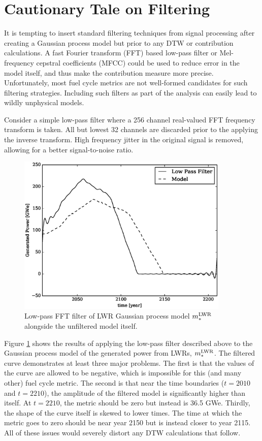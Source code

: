\clearpage
\section{Cautionary Tale on Filtering}
\label{filtering}

It is tempting to insert standard filtering techniques from signal processing 
after creating a Gaussian process model but prior to any DTW or contribution 
calculations. A fast Fourier transform (FFT) \citeme based low-pass filter or 
Mel-frequency cepstral coefficients (MFCC) \citeme could be used to reduce error 
in the model itself, 
and thus make the contribution measure more precise. Unfortunately, most 
fuel cycle metrics are not well-formed candidates for such filtering strategies.
Including such filters as part of the analysis can easily lead to wildly unphysical
models.

Consider a simple low-pass filter where a 256 channel real-valued FFT frequency 
transform is taken.  All but lowest 32 channels are discarded prior to the applying 
the inverse transform. High frequency jitter in the original signal is removed, 
allowing for a better signal-to-noise ratio.

\begin{figure}[htb]
\centering
\includegraphics[width=0.9\textwidth]{fft-lwr-model.eps}
\caption{Low-pass FFT filter of LWR Gaussian process model $m_*^{\mathrm{LWR}}$ alongside
the unfiltered model itself.}
\label{fft-lwr-model}
\end{figure}

Figure \ref{fft-lwr-model} shows the results of applying the low-pass filter 
described above to the Gaussian process model of the generated power from LWRs, 
$m_*^{\mathrm{LWR}}$.  The filtered curve demonstrates at least three major problems.  The
first is that the values of the curve are allowed to be negative, which is 
impossible for this (and many other) fuel cycle metric.  The second is that 
near the time boundaries ($t=2010$ and $t=2210$), the amplitude of the filtered model
is significantly higher than itself. At $t=2210$, the metric should be zero but
instead is 36.5 GWe. Thirdly, the shape of the curve itself is skewed to lower 
times. The time at which the metric goes to zero should be near year 2150 but is 
instead closer to year 2115.  All of these issues would severely distort any 
DTW calculations that follow.

